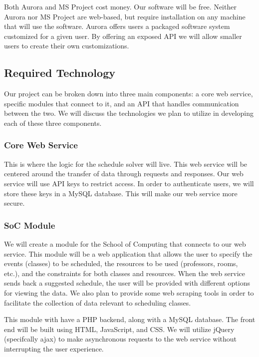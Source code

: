 \documentclass{extarticle}
\begin{document}
Both Aurora and MS Project cost money.  Our software will be free.  Neither Aurora nor MS Project are web-based, but
require installation on any machine that will use the software.  Aurora offers users a packaged software system
customized for a given user.  By offering an exposed API we will allow smaller users to create their own
customizations.

\subsection{Required Technology}
Our project can be broken down into three main components:  a core web service, specific modules that connect to
it, and an API that handles communication between the two.  We will discuss the technologies we plan to utilize in
developing each of these three components.

\subsubsection{Core Web Service}
This is where the logic for the schedule solver will live.  This web service will be centered around the transfer
of data through requests and responses.  Our web service will use API keys to restrict access.  In order to
authenticate users, we will store these keys in a MySQL database.  This will make our web service more secure.

\subsubsection{SoC Module}
We will create a module for the School of Computing that connects to our web service.  This module will be a web
application that allows the user to specify the events (classes) to be scheduled, the resources to be used
(professors, rooms, etc.), and the constraints for both classes and resources.  When the web service sends back a
suggested schedule, the user will be provided with different options for viewing the data.  We also plan to provide
some web scraping tools in order to facilitate the collection of data relevant to scheduling classes.

This module with have a PHP backend, along with a MySQL database.  The front end will be built using HTML,
JavaScript, and CSS.  We will utilize jQuery (specifcally ajax) to make asynchronous requests to the web
service without interrupting the user experience.
\end{document}
